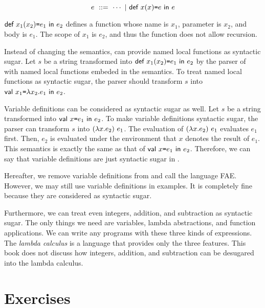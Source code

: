 \[
  e\ ::=\ \cdots\ |\ \erec{x}{x}{e}{e}
\]

$\textsf{def}\ x_1(x_2)\texttt{=} e_1\ \textsf{in}\ e_2$ defines a function whose name is $x_1$, parameter is
$x_2$, and body is $e_1$. The scope of $x_1$ is $e_2$, and thus the function
does not allow recursion.

Instead of changing the semantics, \lang can provide named local functions as
syntactic sugar. Let $s$ be a string transformed into $\textsf{def}\ x_1(x_2)\texttt{=} e_1\ \textsf{in}\ e_2$
by the parser of \lang with named local functions embeded in the semantics.
To treat named local functions as syntactic sugar, the parser should transform
$s$ into $\textsf{val}\ x_1\texttt{=}\lambda x_2.e_1\ \textsf{in}\ e_2$.

Variable definitions can be considered as syntactic sugar as well.
Let $s$ be a string transformed into $\textsf{val}\ x\texttt{=} e_1\ \textsf{in}\ e_2$.
To make variable definitions syntactic sugar, the parser can transform $s$ into
$(\lambda x.e_2)\ e_1$. The evaluation of $(\lambda x.e_2)\ e_1$
evaluates $e_1$ first. Then, $e_2$ is evaluated under the environment that $x$ denotes
the result of $e_1$. This semantics is exactly the same as that of
$\textsf{val}\ x\texttt{=} e_1\ \textsf{in}\ e_2$. Therefore, we can say that variable definitions are just
syntactic sugar in \lang.

Hereafter, we remove variable definitions from \lang and call the language
\textsf{FAE}. However, we may still use variable definitions in examples. It is
completely fine because they are considered as syntactic sugar.

Furthermore, we can treat even integers, addition, and subtraction as syntactic
sugar. The only things we need are variables, lambda abstractions, and function
applications. We can write any programs with these three kinds of expressions.
The \textit{lambda calculus} is a language that provides
only the three features. This book does not discuss how integers, addition, and
subtraction can be desugared into the lambda calculus.

\section{Exercises}

